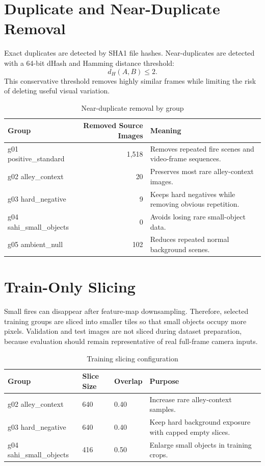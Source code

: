 \documentclass[12pt,a4paper]{report}
\begin{document}
\section{Duplicate and Near-Duplicate Removal}
Exact duplicates are detected by SHA1 file hashes. Near-duplicates are detected with a 64-bit dHash and Hamming distance threshold:
\[
    d_H(A,B) \leq 2.
\]
This conservative threshold removes highly similar frames while limiting the risk of deleting useful visual variation.

\begin{table}[H]
\centering
\caption{Near-duplicate removal by group}
\label{tab:dedupe-group}
\begin{tabularx}{\textwidth}{p{}rY}
\toprule
\textbf{Group} & \textbf{Removed Source Images} & \textbf{Meaning} \\
\midrule
g01 positive\_standard & 1,518 & Removes repeated fire scenes and video-frame sequences. \\
g02 alley\_context & 20 & Preserves most rare alley-context images. \\
g03 hard\_negative & 9 & Keeps hard negatives while removing obvious repetition. \\
g04 sahi\_small\_objects & 0 & Avoids losing rare small-object data. \\
g05 ambient\_null & 102 & Reduces repeated normal background scenes. \\
\bottomrule
\end{tabularx}
\end{table}

\section{Train-Only Slicing}
Small fires can disappear after feature-map downsampling. Therefore, selected training groups are sliced into smaller tiles so that small objects occupy more pixels. Validation and test images are not sliced during dataset preparation, because evaluation should remain representative of real full-frame camera inputs.

\begin{table}[H]
\centering
\caption{Training slicing configuration}
\label{tab:slicing}
\begin{tabularx}{\textwidth}{p{}p{}p{}Y}
\toprule
\textbf{Group} & \textbf{Slice Size} & \textbf{Overlap} & \textbf{Purpose} \\
\midrule
g02 alley\_context & 640 & 0.40 & Increase rare alley-context samples. \\
g03 hard\_negative & 640 & 0.40 & Keep hard background exposure with capped empty slices. \\
g04 sahi\_small\_objects & 416 & 0.50 & Enlarge small objects in training crops. \\
\bottomrule
\end{tabularx}
\end{table}
\end{document}

